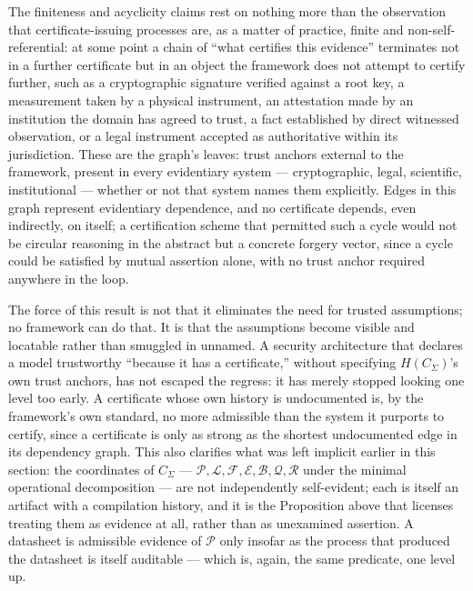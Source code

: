 \documentclass[11pt]{article}
\begin{document}
The finiteness and acyclicity claims rest on nothing more than the observation that certificate-issuing processes are, as a matter of practice, finite and non-self-referential: at some point a chain of ``what certifies this evidence'' terminates not in a further certificate but in an object the framework does not attempt to certify further, such as a cryptographic signature verified against a root key, a measurement taken by a physical instrument, an attestation made by an institution the domain has agreed to trust, a fact established by direct witnessed observation, or a legal instrument accepted as authoritative within its jurisdiction. These are the graph's leaves: trust anchors external to the framework, present in every evidentiary system --- cryptographic, legal, scientific, institutional --- whether or not that system names them explicitly. Edges in this graph represent evidentiary dependence, and no certificate depends, even indirectly, on itself; a certification scheme that permitted such a cycle would not be circular reasoning in the abstract but a concrete forgery vector, since a cycle could be satisfied by mutual assertion alone, with no trust anchor required anywhere in the loop.

The force of this result is not that it eliminates the need for trusted assumptions; no framework can do that. It is that the assumptions become visible and locatable rather than smuggled in unnamed. A security architecture that declares a model trustworthy ``because it has a certificate,'' without specifying $H(C_\Sigma)$'s own trust anchors, has not escaped the regress: it has merely stopped looking one level too early. A certificate whose own history is undocumented is, by the framework's own standard, no more admissible than the system it purports to certify, since a certificate is only as strong as the shortest undocumented edge in its dependency graph. This also clarifies what was left implicit earlier in this section: the coordinates of $C_\Sigma$ --- $\mathcal{P}, \mathcal{L}, \mathcal{F}, \mathcal{E}, \mathcal{B}, \mathcal{Q}, \mathcal{R}$ under the minimal operational decomposition --- are not independently self-evident; each is itself an artifact with a compilation history, and it is the Proposition above that licenses treating them as evidence at all, rather than as unexamined assertion. A datasheet is admissible evidence of $\mathcal{P}$ only insofar as the process that produced the datasheet is itself auditable --- which is, again, the same predicate, one level up.

\end{document}

